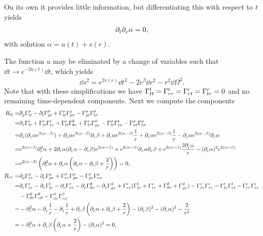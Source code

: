 On its own it provides little information, but differentiating this with respect to $t$ yields
\begin{align*}
	\partial^{}_{t}\partial^{}_{r}\alpha = 0,
\end{align*}
with solution $\alpha = u(t) + v(r)$.

The function $u$ may be eliminated by a change of variables such that $\dd{t}\to e^{-2u(t)}\dd{t}$, which yields
\begin{align*}
	\dd{s}^{2} = e^{2v(r)}\dd{t}^{2} - 2e^{\beta}\dd{r}^{2} - r^{2}\dd{\Omega}^{2}.
\end{align*}
Note that with these simplifications we have $\chris{t}{t}{t} = \chris{t}{r}{r} = \chris{r}{r}{t} = \chris{r}{t}{r} = 0$ and no remaining time-dependent components. Next we compute the components
\begin{align*}
	R_{tt} =& \del{\rho}{\chris{\rho}{t}{t}} - \del{t}{\chris{\rho}{\rho}{t}} + \chris{\sigma}{t}{t}\chris{\rho}{\rho}{\sigma} - \chris{\sigma}{\rho}{t}\chris{\rho}{t}{\sigma} \\
	       =& \del{r}{\chris{r}{t}{t}} + \chris{r}{t}{t}\chris{r}{r}{r} + \chris{r}{t}{t}\chris{\theta}{\theta}{r} + \chris{r}{t}{t}\chris{\phi}{\phi}{r} - \chris{\sigma}{t}{t}\chris{t}{t}{\sigma} - \chris{\sigma}{\sigma}{t}\chris{\sigma}{t}{\sigma} \\
	       =& \del{r}{(\del{r}{\alpha}e^{2(\alpha - \beta)})} + \del{r}{\alpha}e^{2(\alpha - \beta)}\del{r}{\beta} + \del{r}{\alpha}e^{2(\alpha - \beta)}\frac{1}{r} + \del{r}{\alpha}e^{2(\alpha - \beta)}\frac{1}{r} - \del{r}{\alpha}e^{2(\alpha - \beta)}\del{r}{\alpha} \\
	       =& e^{2(\alpha - \beta)}\del[2]{r}{\alpha} + 2\del{r}{\alpha}(\del{r}{\alpha} - \del{r}{\beta})e^{2(\alpha - \beta)} + e^{2(\alpha - \beta)}\del{r}{\alpha}\del{r}{\beta} + e^{2(\alpha - \beta)}\frac{2\del{r}{\alpha}}{r} - (\del{r}{\alpha})^{2}e^{2(\alpha - \beta)} \\
	       =& e^{2(\alpha - \beta)}\left(\del[2]{r}{\alpha} + \del{r}{\alpha}\left(\del{r}{\alpha} - \del{r}{\beta} + \frac{2}{r}\right)\right) = 0, \\
	R_{rr} =& \del{\rho}{\chris{\rho}{r}{r}} - \del{r}{\chris{\rho}{\rho}{r}} + \chris{\sigma}{r}{r}\chris{\rho}{\rho}{\sigma} - \chris{\sigma}{\rho}{r}\chris{\rho}{r}{\sigma} \\
	       =& \del{r}{\chris{r}{r}{r}} - \del{r}{\chris{t}{t}{r}} - \del{r}{\chris{r}{r}{r}} - \del{r}{\chris{\theta}{\theta}{r}} - \del{r}{\chris{\phi}{\phi}{r}} + \chris{r}{r}{r}(\chris{t}{t}{r} + \chris{r}{r}{r} + \chris{\theta}{\theta}{r} + \chris{\phi}{\phi}{r}) - \chris{r}{r}{r}\chris{r}{r}{r} - \chris{t}{t}{r}\chris{t}{r}{t} - \chris{r}{r}{r}\chris{r}{r}{r} \\
	        &- \chris{\theta}{\theta}{r}\chris{\theta}{r}{\theta} - \chris{\phi}{\phi}{r}\chris{\phi}{r}{\phi} \\
	       =& -\del[2]{r}{\alpha} - \del{r}{\frac{1}{r}} - \del{r}{\frac{1}{r}} + \del{r}{\beta}\left(\del{r}{\alpha} + \del{r}{\beta} + \frac{2}{r}\right) - (\del{r}{\beta})^{2} - (\del{r}{\alpha})^{2} - \frac{2}{r^{2}} \\
	       =& -\del[2]{r}{\alpha} + \del{r}{\beta}\left(\del{r}{\alpha} + \frac{2}{r}\right) - (\del{r}{\alpha})^{2} = 0,
\end{align*}
